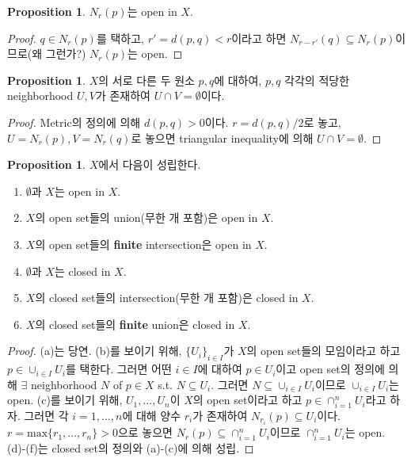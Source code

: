 \documentclass[12pt]{article}
\theoremstyle{definition}
\newtheorem{prop}[thm]{Proposition}
\begin{document}
	\begin{prop}
		\(N_r (p)\)는 open in \(X\).
	\end{prop}
	\begin{proof}
		\(q \in N_r (p)\)를 택하고, \(r'=d(p, q) < r\)이라고 하면 \(N_{r - r'} (q) \subseteq N_r (p)\)이므로(왜 그런가?) \(N_r (p)\)는 open.
	\end{proof}

	\begin{prop} \label{prop metric haus}
		\(X\)의 서로 다른 두 원소 \(p, q\)에 대하여, \(p, q\) 각각의 적당한 neighborhood \(U, V\)가 존재하여 \(U \cap V = \emptyset\)이다.
	\end{prop}
	
	\begin{proof}
		Metric의 정의에 의해 \(d(p, q) > 0\)이다. \(r = d(p, q) / 2\)로 놓고, \(U = N_r (p), V = N_r(q)\)로 놓으면 triangular inequality에 의해 \(U \cap V = \emptyset\).
	\end{proof}

	\begin{prop} \label{prop metric open ax}
		\(X\)에서 다음이 성립한다.
		\begin{enumerate}[label=(\alph*), leftmargin=2\parindent]
			\item
			\(\emptyset\)과 \(X\)는 open in \(X\).
			\item
			\(X\)의 open set들의 union(무한 개 포함)은 open in \(X\).
			\item
			\(X\)의 open set들의 \textbf{finite} intersection은 open in \(X\).
			\item
			\(\emptyset\)과 \(X\)는 closed in \(X\).
			\item
			\(X\)의 closed set들의 intersection(무한 개 포함)은 closed in \(X\).
			\item
			\(X\)의 closed set들의 \textbf{finite} union은 closed in \(X\).
		\end{enumerate}
	\end{prop}

	\begin{proof}
		(a)는 당연. (b)를 보이기 위해, \(\{U_i\}_{i \in I}\)가 \(X\)의 open set들의 모임이라고 하고 \(p \in \cup_{i\in I} U_i\)를 택한다. 그러면 어떤 \(i \in I\)에 대하여 \(p \in U_i\)이고 open set의 정의에 의해 \(\exists\) neighborhood \(N\) of \(p \in X\) s.t. \(N \subseteq U_i\). 그러면 \(N \subseteq \cup_{i\in I} U_i\)이므로 \(\cup_{i\in I} U_i\)는 open. (c)를 보이기 위해, \(U_1, ..., U_n\)이 \(X\)의 open set이라고 하고 \(p \in \cap_{i=1}^n U_i\)라고 하자. 그러면 각 \(i=1, ..., n\)에 대해 양수 \(r_i\)가 존재하여 \(N_{r_i} (p) \subseteq U_i\)이다. \(r = \mathrm{max}\{r_1, ..., r_n\}>0\)으로 놓으면 \(N_r (p) \subseteq \cap_{i=1}^n U_i\)이므로 \(\cap_{i=1}^n U_i\)는 open. (d)-(f)는 closed set의 정의와 (a)-(c)에 의해 성립.
	\end{proof}
\end{document}
